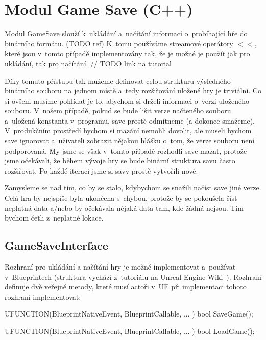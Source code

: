 
\section{Modul Game Save (C++)}

Modul GameSave slouží k~ukládání a~načítání informací o~probíhající hře do binárního formátu. (TODO ref)  K~tomu používáme streamové operátory $<<$, které jsou v~tomto případě implementovány tak, že je možné je použít jak pro ukládání, tak pro načítání. // TODO link na tutorial

Díky tomuto přístupu tak můžeme definovat celou strukturu výsledného binárního souboru na jednom místě a~tedy rozšiřování uložené hry je triviální. Co si ovšem musíme pohlídat je to, abychom si drželi informaci o~verzi uloženého souboru. V~našem případě, pokud se bude lišit verze načteného souboru a~uložená konstanta v~programu, save prostě odmítneme (a dokonce smažeme). V~produkčním prostředí bychom si mazání nemohli dovolit, ale museli bychom save ignorovat a~uživateli zobrazit nějakou hlášku o~tom, že verze souboru není podporovaná. My jsme se však v~tomto případě rozhodli save mazat, protože jsme očekávali, že během vývoje hry se bude binární struktura savu často rozšiřovat. Po každé iteraci jsme si savy prostě vytvořili nové.

Zamysleme se nad tím, co by se stalo, kdybychom se snažili načíst save jiné verze. Celá hra by nejspíše byla ukončena s~chybou, protože by se pokoušela číst neplatná data a/nebo by očekávala nějaká data tam, kde žádná nejsou. Tím bychom četli z~neplatné lokace.




\subsection{GameSaveInterface}

Rozhraní pro ukládání a načítání hry  je možné implementovat a~používat v~Blueprintech (struktura vychází z~tutoriálu na Unreal Engine Wiki~\citep{ue_interfaces_tut}). Rozhraní definuje dvě veřejné metody, které musí actoři v~UE při implementaci tohoto rozhraní implementovat:

\begin{code}
UFUNCTION(BlueprintNativeEvent, BlueprintCallable, ... )
	bool SaveGame();

UFUNCTION(BlueprintNativeEvent, BlueprintCallable, ... )
	bool LoadGame();
\end{code}

